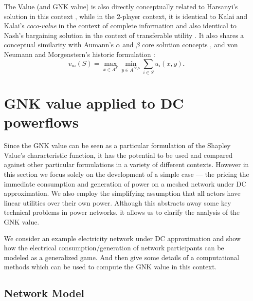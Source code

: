 The Value (and GNK value) is also directly conceptually related to Harsanyi's solution in this context \cite{values3},
while in the 2-player context, it is identical to Kalai and Kalai's \textit{coco-value} in the context of complete information \cite{kalai1,Kalai2010,value2} 
and also identical to Nash's bargaining solution in the context of transferable utility \cite{nash2,value2}.
It also shares a conceptual similarity with Aumann's $\alpha$ and $\beta$ core solution concepts \cite{aumann1961core}, and von Neumann and Morgenstern's historic formulation \cite{1944,KOHLBERG2018139,values3}:
\begin{equation}\label{knvalue3}v_m(S) = \max_{x\in A^S}\min_{y\in A^{N\setminus S}} \sum_{i\in S} u_i(x,y).\end{equation}


\section{GNK value applied to DC powerflows}\label{more_involved}

Since the GNK value can be seen as a particular formulation of the Shapley Value's characteristic function, it has the potential to be used and compared against other particular formulations in a variety of different contexts.
However in this section we focus solely on the development of a simple case --- the pricing the immediate consumption and generation of power on a meshed network under DC approximation.
We also employ the simplifying assumption that all actors have linear utilities over their own power.
Although this abstracts away some key technical problems in power networks, it allows us to clarify the analysis of the GNK value.

We consider an example electricity network under DC approximation and show how the electrical consumption/generation of network participants can be modeled as a generalized game. And then give some details of a computational methods which can be used to compute the GNK value in this context.

\subsection{Network Model}\label{sec:the_setup}


